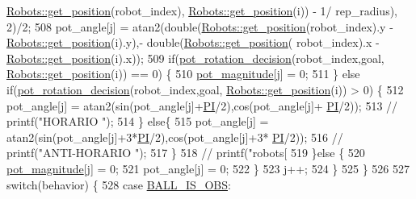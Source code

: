 \begin{DoxyCode}
{      \hyperlink{class_robots_a1fca8f2f5070176faa6ba1efa2f1ff14}{Robots::get\_position}(robot\_index), \hyperlink{class_robots_a1fca8f2f5070176faa6ba1efa2f1ff14}{Robots::get\_position}(i)) - 1/
      rep\_radius), 2)/2;
508                 pot\_angle[j] = atan2(\textcolor{keywordtype}{double}(\hyperlink{class_robots_a1fca8f2f5070176faa6ba1efa2f1ff14}{Robots::get\_position}(robot\_index).y - 
      \hyperlink{class_robots_a1fca8f2f5070176faa6ba1efa2f1ff14}{Robots::get\_position}(i).y),- \textcolor{keywordtype}{double}(\hyperlink{class_robots_a1fca8f2f5070176faa6ba1efa2f1ff14}{Robots::get\_position}(
      robot\_index).x - \hyperlink{class_robots_a1fca8f2f5070176faa6ba1efa2f1ff14}{Robots::get\_position}(i).x));
509                 \textcolor{keywordflow}{if}(\hyperlink{class_strategy_abc4ef2ab65f3864218c1736d7c35d46a}{pot\_rotation\_decision}(robot\_index,goal,
      \hyperlink{class_robots_a1fca8f2f5070176faa6ba1efa2f1ff14}{Robots::get\_position}(i)) == 0) \{
510                     \hyperlink{class_strategy_afbe79a1885f82b70c71eb30d07fde921}{pot\_magnitude}[j] = 0;
511                 \} \textcolor{keywordflow}{else} \textcolor{keywordflow}{if}(\hyperlink{class_strategy_abc4ef2ab65f3864218c1736d7c35d46a}{pot\_rotation\_decision}(robot\_index,goal,
      \hyperlink{class_robots_a1fca8f2f5070176faa6ba1efa2f1ff14}{Robots::get\_position}(i)) > 0) \{
512                     pot\_angle[j] = atan2(sin(pot\_angle[j]+\hyperlink{strategy_8cpp_a598a3330b3c21701223ee0ca14316eca}{PI}/2),cos(pot\_angle[j]+
      \hyperlink{strategy_8cpp_a598a3330b3c21701223ee0ca14316eca}{PI}/2));
513                     \textcolor{comment}{//  printf("HORARIO ");}
514                 \} \textcolor{keywordflow}{else}\{
515                     pot\_angle[j] = atan2(sin(pot\_angle[j]+3*\hyperlink{strategy_8cpp_a598a3330b3c21701223ee0ca14316eca}{PI}/2),cos(pot\_angle[j]+3*
      \hyperlink{strategy_8cpp_a598a3330b3c21701223ee0ca14316eca}{PI}/2));
516                     \textcolor{comment}{//  printf("ANTI-HORARIO ");}
517                 \}
518             \textcolor{comment}{// printf("robots[%
519             \}\textcolor{keywordflow}{else} \{
520                 \hyperlink{class_strategy_afbe79a1885f82b70c71eb30d07fde921}{pot\_magnitude}[j] = 0;
521                 pot\_angle[j] = 0;
522             \}
523             j++;
524         \}
525     \}
526 
527     \textcolor{keywordflow}{switch}(behavior) \{
528         \textcolor{keywordflow}{case} \hyperlink{strategy_8hpp_a2cfb8f1dc12a40494d3679765c799742}{BALL\_IS\_OBS}:
}}
\end{DoxyCode}
